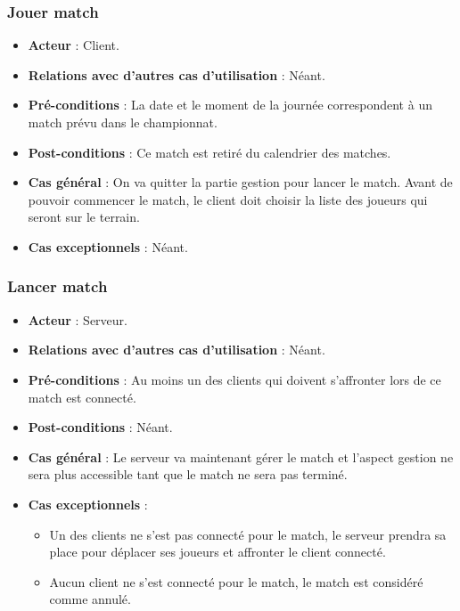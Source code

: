\documentclass[a4paper,titlepage]{scrreprt}
\begin{document}
    \subsubsection{Jouer match}
      \begin{itemize}
        \item \textbf{Acteur}  : Client.
        \item \textbf{Relations avec d'autres cas d'utilisation}  : Néant.
        \item \textbf{Pré-conditions} : La date et le moment de la journée correspondent à un match prévu dans le championnat.
        \item \textbf{Post-conditions} : Ce match est retiré du \gls{calendrier} des matches.
        \item \textbf{Cas général} : On va quitter la partie gestion pour lancer le match. Avant de pouvoir commencer le match, le client doit choisir la liste des joueurs qui seront sur le terrain. 
        \item \textbf{Cas exceptionnels} : Néant.
      \end{itemize}
    \subsubsection{Lancer match}
      \begin{itemize}
        \item \textbf{Acteur}  : Serveur.
        \item \textbf{Relations avec d'autres cas d'utilisation}  : Néant.
        \item \textbf{Pré-conditions} : Au moins un des clients qui doivent s’affronter lors de ce match est connecté.
        \item \textbf{Post-conditions} : Néant.
        \item \textbf{Cas général} : Le serveur va maintenant gérer le match et l’aspect gestion ne sera plus accessible tant que le match ne sera pas terminé.
        \item \textbf{Cas exceptionnels} : 
          \begin{itemize}
            \item Un des clients ne s’est pas connecté pour le match, le serveur prendra sa place pour déplacer ses joueurs et affronter le client connecté.
			\item Aucun client ne s’est connecté pour le match, le match est considéré comme annulé.
          \end{itemize}    	
      \end{itemize}
\end{document}
